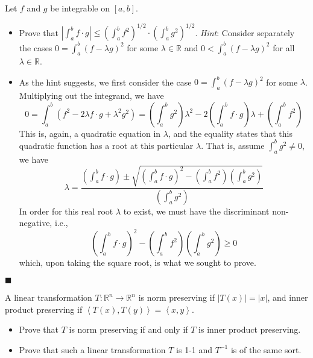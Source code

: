 \documentclass[12pt]{article}
\renewcommand{\qed}{\hfill$\blacksquare$}
\renewenvironment{proof}{\begin{addmargin}[1em]{0em}\begin{newproof}}{\end{newproof}\end{addmargin}\qed}
\newenvironment{problem}[2][Problem]{\begin{trivlist}
\item[\hskip \labelsep {\bfseries #1}\hskip \labelsep {\bfseries #2.}]}{\end{trivlist}}
\begin{document}
\begin{problem}{1-6}
Let $f$ and $g$ be integrable on $\left[a,b\right]$.
\begin{itemize}
	\item Prove that $\left|\int_a^b f\cdot g \right| \leq \left(\int_a^b f^2\right)^{1/2}\cdot \left(\int_a^b g^2\right)^{1/2}$. \textit{Hint}: Consider separately the cases $0 = \int_a^b \left(f-\lambda g\right)^2$ for some $\lambda \in \mathbb{R}$ and $0 < \int_a^b \left(f-\lambda g\right)^2$ for all $\lambda \in \mathbb{R}$.
\end{itemize}
\end{problem}
\begin{proof}
\begin{itemize}
	\item As the hint suggests, we first consider the case $0 = \int_a^b \left(f-\lambda g\right)^2$ for some $\lambda$. Multiplying out the integrand, we have $$ 0 = \int_a^b \left(f^2 - 2\lambda f\cdot g + \lambda^2 g^2 \right) =  \left( \int_a^b g^2\right) \lambda^2 - 2\left(\int_a^b f\cdot g\right) \lambda + \left(\int_a^b f^2\right) $$ This is, again, a quadratic equation in $\lambda$, and the equality states that this quadratic function has a root at this particular $\lambda$. That is, assume $\int_a^b g^2 \neq 0$, we have $$ \lambda = \frac{\left(\int_a^b f\cdot g\right) \pm \sqrt{\left(\int_a^b f\cdot g\right)^2 - \left(\int_a^b f^2\right)\left(\int_a^b g^2\right) }}{\left(\int_a^b g^2 \right)} $$ In order for this real root $\lambda$ to exist, we must have the discriminant non-negative, i.e., $$\left(\int_a^b f\cdot g\right)^2 - \left(\int_a^b f^2\right)\left(\int_a^b g^2\right) \geq 0 $$ which, upon taking the square root, is what we sought to prove.
\end{itemize}
\end{proof}





\begin{problem}{1-7}
A linear transformation $T: \mathbb{R}^n \rightarrow \mathbb{R}^n$ is norm preserving if $\left| T\left(x\right) \right| = \left| x \right|$, and inner product preserving if $\left\langle T\left(x\right), T\left(y\right) \right\rangle = \left\langle x,y\right\rangle$.
\begin{itemize}
	\item Prove that $T$ is norm preserving if and only if $T$ is inner product preserving. \\
	\item Prove that such a linear transformation $T$ is 1-1 and $T^{-1}$ is of the same sort.\\
\end{itemize}
\end{problem}
\end{document}
